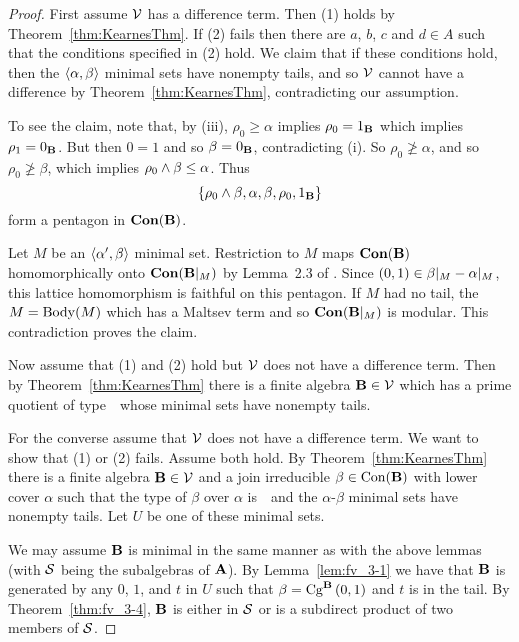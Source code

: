 \begin{proof}
First assume $\sV$ has a difference term.
Then (1) holds by Theorem~\ref{thm:KearnesThm}.
If (2) fails then there are $a$, $b$, $c$ and $d \in A$ such
that the conditions specified in (2) hold. We claim that
if these conditions hold, then the $\la \alpha, \beta \ra$
minimal sets have nonempty tails, and so $\sV$ cannot have 
a difference by Theorem~\ref{thm:KearnesThm}, contradicting
our assumption.

To see the claim, note that, by (iii), $\rho_0 \ge \alpha$ implies
$\rho_0 = 1_{\alg B}$ which implies $\rho_1 = 0_{\alg B}$. But
then $0 = 1$ and so $\beta = 0_{\alg B}$, contradicting (i).
So $\rho_0 \ngeq \alpha$, and so $\rho_0 \ngeq \beta$,
which implies $\rho_0 \meet \beta \le \alpha$. Thus
\[
\{\rho_0 \meet \beta, \alpha, \beta, \rho_0, 1_{\alg B}\}
\]
form a pentagon in $\Con(\alg B)$.

Let $M$ be an $\la \alpha',\beta \ra$ minimal set.  
Restriction to $M$ maps  $\Con (\alg B)$ homomorphically 
onto $\Con (\alg B|_M)$ by Lemma~2.3 of \cite{HM:1988}. 
Since $(0,1) \in \beta|_M\mysetminus \alpha|_M$, this 
lattice homomorphism is faithful on this pentagon. If 
$M$ had no tail, the $M = \body(M)$ which has a Maltsev
term and so $\Con(\alg B|_M)$ is modular. This contradiction
proves the claim.

Now assume that (1) and (2) hold but $\sV$ does not have a
difference term. Then by Theorem~\ref{thm:KearnesThm} there
is a finite algebra $\alg B \in \sV$ which has a prime 
quotient of type~\atyp\ whose minimal sets have nonempty tails.

For the converse assume that $\sV$ does not have a difference 
term. 
We want to show that (1) or (2) fails. Assume both hold.
By Theorem~\ref{thm:KearnesThm} there is a finite 
algebra $\alg B \in \sV$ and a join irreducible 
$\beta \in \op{Con}(\alg B)$ with lower cover 
$\alpha$ such that the type of $\beta$ over $\alpha$ is~\atyp\
and the $\alpha$-$\beta$ minimal sets have
nonempty tails. Let $U$ be one of these minimal sets.


We may assume $\alg B$ is minimal in the same manner as with the
above lemmas (with $\sS$ being the subalgebras of $\alg A$).
By Lemma~\ref{lem:fv_3-1} 
we have that $\alg B$ is generated by any $0$, $1$, and $t$ in
$U$ such
that $\beta = \Cga 01{B}$ and $t$ is in the tail. By 
Theorem~\ref{thm:fv_3-4}, $\alg B$ is either 
in $\sS$ or is a subdirect product of two members of $\sS$.


\end{proof}
